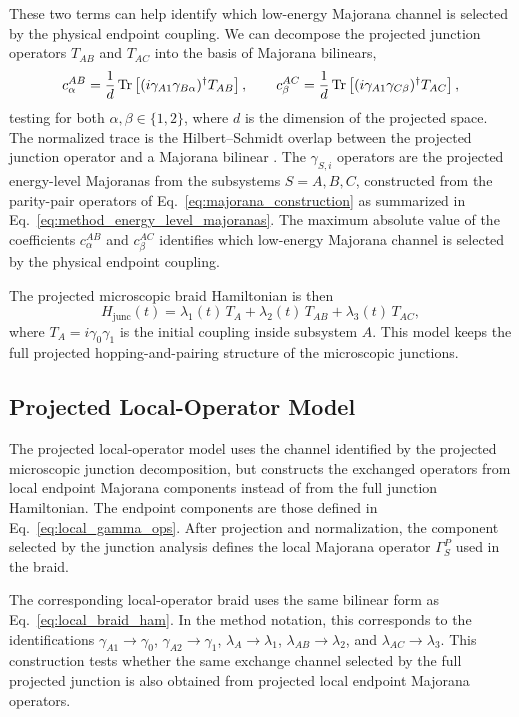 These two terms can help identify which low-energy Majorana channel is selected by the physical endpoint coupling. We can decompose the projected junction operators $T_{AB}$ and $T_{AC}$ into the basis of Majorana bilinears,
\begin{equation}
  c_{\alpha}^{AB} = \frac{1}{d} \Tr\left[(i\gamma_{A1}\gamma_{B\alpha})^{\dagger} T_{AB}\right],
    \qquad
    c_{\beta}^{AC} = \frac{1}{d} \Tr\left[(i\gamma_{A1}\gamma_{C\beta})^{\dagger} T_{AC}\right],
\end{equation}
testing for both $\alpha,\beta \in \{1,2\}$, where $d$ is the dimension of the projected space. The normalized trace is the Hilbert--Schmidt overlap between the projected junction operator and a Majorana bilinear \cite{hazewinkelEncyclopaediaMathematics2002}. The $\gamma_{S,i}$ operators are the projected energy-level Majoranas from the subsystems $S=A,B,C$, constructed from the parity-pair operators of Eq.~\ref{eq:majorana_construction} as summarized in Eq.~\ref{eq:method_energy_level_majoranas}. The maximum absolute value of the coefficients $c_{\alpha}^{AB}$ and $c_{\beta}^{AC}$ identifies which low-energy Majorana channel is selected by the physical endpoint coupling.


The projected microscopic braid Hamiltonian is then
\begin{equation}
H_{\mathrm{junc}}(t)
=
\lambda_1(t)\,T_A
+
\lambda_2(t)\,T_{AB}
+
\lambda_3(t)\,T_{AC},
\label{eq:brajunc}
\end{equation}
where $T_A=i\gamma_0\gamma_1$ is the initial coupling inside subsystem $A$.
This model keeps the full projected hopping-and-pairing structure of the
microscopic junctions.

\subsection{Projected Local-Operator Model}
The projected local-operator model uses the channel identified by the projected
microscopic junction decomposition, but constructs the exchanged operators from
local endpoint Majorana components instead of from the full junction
Hamiltonian. The endpoint components are those defined in
Eq.~\ref{eq:local_gamma_ops}. After projection and normalization, the component
selected by the junction analysis defines the local Majorana operator
$\Gamma_S^P$ used in the braid.

The corresponding local-operator braid uses the same bilinear form as
Eq.~\ref{eq:local_braid_ham}. In the method notation, this corresponds to the
identifications $\gamma_{A1}\rightarrow\gamma_0$,
$\gamma_{A2}\rightarrow\gamma_1$, $\lambda_A\rightarrow\lambda_1$,
$\lambda_{AB}\rightarrow\lambda_2$, and
$\lambda_{AC}\rightarrow\lambda_3$.
This construction tests whether the same exchange channel selected by the full
projected junction is also obtained from projected local endpoint Majorana
operators.


